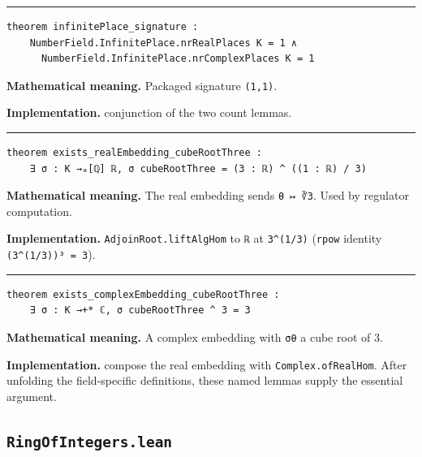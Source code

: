 \documentclass[UTF8,a4paper,11pt,fontset=fandol]{ctexart}
\theoremstyle{definition}
\newcommand{\statementsep}{\par\medskip\hrule\medskip}
\begin{document}
\statementsep
\begin{verbatim}
theorem infinitePlace_signature :
    NumberField.InfinitePlace.nrRealPlaces K = 1 ∧
      NumberField.InfinitePlace.nrComplexPlaces K = 1
\end{verbatim}
\noindent\textbf{Mathematical meaning.} Packaged signature \texttt{(1,1)}.\par
\noindent\textbf{Implementation.} conjunction of the two count lemmas.\par
\statementsep
\begin{verbatim}
theorem exists_realEmbedding_cubeRootThree :
    ∃ σ : K →ₐ[ℚ] ℝ, σ cubeRootThree = (3 : ℝ) ^ ((1 : ℝ) / 3)
\end{verbatim}
\noindent\textbf{Mathematical meaning.} The real embedding sends \texttt{θ ↦ ∛3}. Used by regulator computation.\par
\noindent\textbf{Implementation.} \texttt{AdjoinRoot.\allowbreak{}liftAlgHom} to \texttt{ℝ} at \texttt{3\textasciicircum{}(1/\allowbreak{}3)} (\texttt{rpow} identity \texttt{(3\textasciicircum{}(1/\allowbreak{}3))³ = 3}).\par
\statementsep
\begin{verbatim}
theorem exists_complexEmbedding_cubeRootThree :
    ∃ σ : K →+* ℂ, σ cubeRootThree ^ 3 = 3
\end{verbatim}
\noindent\textbf{Mathematical meaning.} A complex embedding with \texttt{σθ} a cube root of 3.\par
\noindent\textbf{Implementation.} compose the real embedding with \texttt{Complex.\allowbreak{}ofRealHom}. After unfolding the field-specific definitions, these named lemmas supply the essential argument.\par

\subsection{\texttt{RingOfIntegers.lean}}
\end{document}
